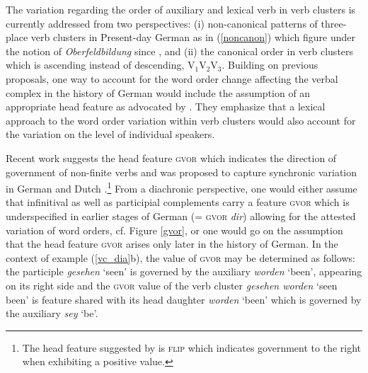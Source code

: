 \documentclass[output=paper
	        ,collection
	        ,collectionchapter
 	        ,biblatex
                ,babelshorthands
                ,newtxmath
                ,draftmode
                ,colorlinks, citecolor=brown
]{./langsci/langscibook}
\begin{document}
The variation regarding the order of auxiliary and lexical verb in verb clusters is currently addressed from two perspectives: (i) non-canonical patterns of three-place verb clusters in Present-day German as in (\ref{noncanon}) which figure under the notion of \textit{Oberfeldbildung} since \cite{bech1983}, and (ii) the canonical order in  verb clusters which is ascending instead of descending, \ie V$_1$V$_2$V$_3$. Building on previous proposals, one way to account for the word order change affecting the verbal complex in the history of German would include the assumption of an appropriate head feature as advocated by \cite{HiNa94}. They emphasize that a lexical approach to the word order variation within verb clusters would also account for the variation on the level of individual speakers.

Recent work suggests the head feature \textsc{gvor} which indicates the direction of government of non-finite verbs and was proposed to capture synchronic variation in German and Dutch \citep{BoNo1996,kathol2000,augustinus2015}.\footnote{The head feature suggested by \cite{HiNa94} is \textsc{flip} which indicates government to the right when exhibiting a positive value.} From a diachronic perspective, one would either assume that infinitival as well as participial complements carry a feature \textsc{gvor} which is underspecified in earlier stages of German (= \textsc{gvor} \textit{dir}) allowing for the attested variation of word orders, cf. Figure \ref{gvor}, or one would go on the assumption that the head feature \textsc{gvor} arises only later in the history of German. In the context of example (\ref{vc_dia}b), the value of \textsc{gvor} may be determined as follows: the participle \textit{gesehen} `seen' is governed by the auxiliary \textit{worden} `been', appearing on its right side and the \textsc{gvor} value of the verb cluster \textit{gesehen worden} `seen been' is feature shared with its head daughter \textit{worden} `been' which is governed by the auxiliary \textit{sey} `be'.  
\end{document}
